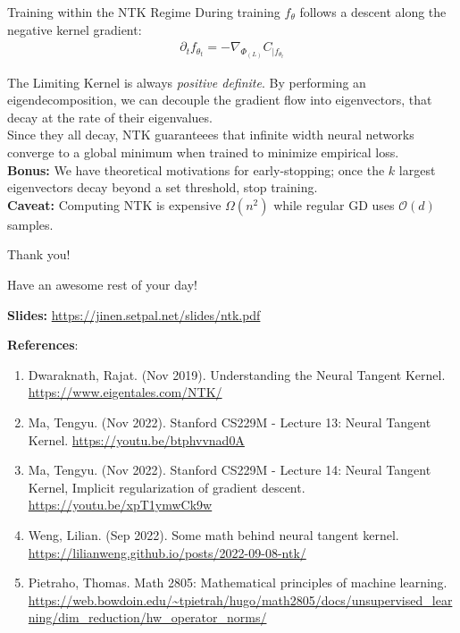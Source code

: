 \documentclass{beamer}
\begin{document}
\begin{frame}{Training within the NTK Regime}
	During training $f_\theta$ follows a descent along the negative kernel gradient:
	\begin{gather}
		\partial_t f_{\theta_t} = -\nabla_{\Phi_{(L)}} C_{| f_{\theta_t}}
	\end{gather}


	The Limiting Kernel is always \textit{positive definite}. By performing an eigendecomposition, we can decouple the gradient flow into eigenvectors, that decay at the rate of their eigenvalues. \pause \newline \\

	Since they all decay, NTK guaranteees that infinite width neural networks converge to a global minimum when trained to minimize empirical loss. \pause \newline \\

	\textbf{Bonus:} We have theoretical motivations for early-stopping; once the $k$ largest eigenvectors decay beyond a set threshold, stop training. \pause \newline \\

	\textbf{Caveat:} Computing NTK is expensive $\Omega(n^2)$ while regular GD uses $\mathcal{O}(d)$ samples.
\end{frame}

\begin{frame}{Thank you!}
	\begin{center}
		Have an awesome rest of your day!
	\end{center}
	\begin{center}
		\textbf{Slides:} \url{https://jinen.setpal.net/slides/ntk.pdf}
	\end{center}

	\textbf{References}:
	\begin{enumerate}[label=\arabic*.]
		\item Dwaraknath, Rajat. (Nov 2019). Understanding the Neural Tangent Kernel. \url{https://www.eigentales.com/NTK/}
		\item Ma, Tengyu. (Nov 2022). Stanford CS229M - Lecture 13: Neural Tangent Kernel. \url{https://youtu.be/btphvvnad0A}
		\item Ma, Tengyu. (Nov 2022). Stanford CS229M - Lecture 14: Neural Tangent Kernel, Implicit regularization of gradient descent. \url{https://youtu.be/xpT1ymwCk9w}
		\item Weng, Lilian. (Sep 2022). Some math behind neural tangent kernel. \url{https://lilianweng.github.io/posts/2022-09-08-ntk/}
		\item Pietraho, Thomas. Math 2805: Mathematical principles of machine learning. {\small\url{https://web.bowdoin.edu/~tpietrah/hugo/math2805/docs/unsupervised_learning/dim_reduction/hw_operator_norms/}}
	\end{enumerate}
\end{frame}
\end{document}
